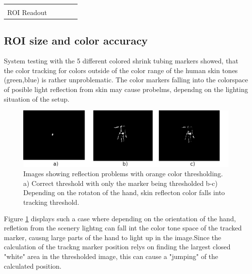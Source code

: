 \begin{table}[H]
\begin{tabular}{|l|l|l|l|l}
                     &                                                                             &                                                                          &                                                                                  &  \\ \cline{1-4}
ROI Readout          &                                                                             &                                                                          &                                                                                  &  \\ \cline{1-4}
\end{tabular}
\end{table}
\subsection{ROI size and color accuracy}
System testing with the 5 different colored shrink tubing markers showed, that the color tracking for colors outside of the color range of the human skin tones (green,blue) is rather unproblematic. The color markers falling into the colorspace of posible light reflection from skin may cause probelms, dependng on the lighting situation of the setup.
\begin{figure}[H]
\includegraphics[width=\textwidth]{images/color_tracking_probs.png}
\caption{Images showing reflection problems with  orange color thresholding. a) Correct threshold with only the marker being thresholded b-c) Depending on the rotaton of the hand, skin reflecton color falls into tracking threshold.}
\label{img:Color_reflecton_problems} 
\end{figure}
Figure \ref{img:Color_reflecton_problems} displays such a case where depending on the orientation of the hand, refletion from the scenery lightng can fall int the color tone space of the tracked marker, causng large parts of the hand to light up in the image.Since the calculation of the trackng marker position relys on finding the largest closed "white" area in the thresholded image, this can cause a "jumping" of the calculated position. 
